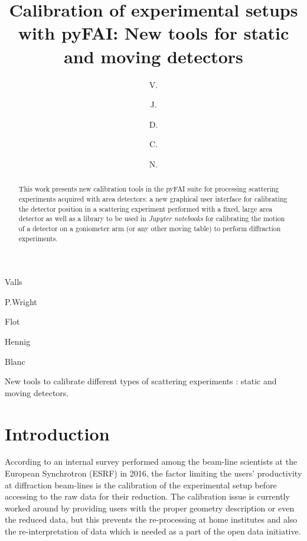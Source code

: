 \documentclass[preprint, pdf]{iucr}              %
\begin{document}

\title{Calibration of experimental setups with {pyFAI}: New tools for static
and moving detectors}

 \author[a]{V.}{Valls}
 \author[a]{J.}{P.}{Wright}
 \author[a]{D.}{Flot}
 \author[a]{C.}{Hennig}
 \author[a]{N.}{Blanc}
 
 





\maketitle                        %

\begin{synopsis}
New tools to calibrate different types of scattering experiments : static
and moving detectors.
\end{synopsis}

\begin{abstract}


This work presents new calibration tools in the pyFAI
suite for processing scattering experiments acquired with area detectors:
a new graphical user interface for calibrating the detector position in a  
scattering experiment performed with a fixed, large area detector as well as 
a library to be used in \textit{Jupyter notebooks} for calibrating the motion
of a detector on a goniometer arm (or any other moving table) to perform
diffraction experiments.
\end{abstract}


\section{Introduction}

According to an internal survey performed among the beam-line scientists at
the European Synchrotron (ESRF) in 2016, the factor limiting the users'
productivity at diffraction beam-lines is the calibration of the experimental
setup before accessing to the raw data for their reduction. 
The calibration issue is currently worked around by providing users with the
proper geometry description or even the reduced data, but this prevents the
re-processing at home institutes and also the re-interpretation of data which
is needed as a part of the open data initiative.
\end{document}
